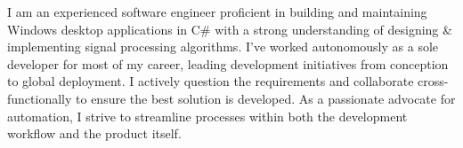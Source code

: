 I am an experienced software engineer proficient in building and maintaining Windows desktop applications in C\# with a strong understanding of designing \& implementing signal processing algorithms. I’ve worked autonomously as a sole developer for most of my career, leading development initiatives from conception to global deployment. I actively question the requirements and collaborate cross-functionally to ensure the best solution is developed. As a passionate advocate for automation, I strive to streamline processes within both the development workflow and the product itself.